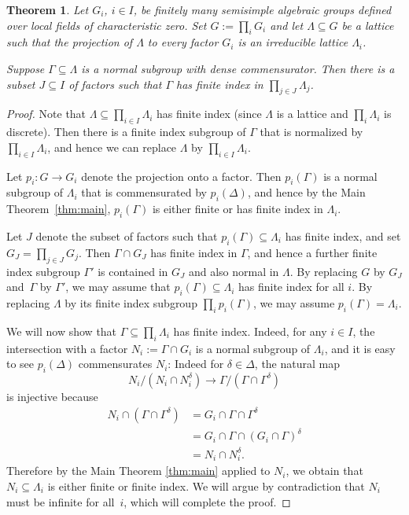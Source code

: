 \documentclass[11pt]{article}
\numberwithin{equation}{section}\providecommand{\llangle}{\langle\!\langle}\providecommand{\rrangle}{\rangle\!\rangle}\providecommand{\Asterisk}{\ast}
\newtheorem{thm}{Theorem}[section]
\theoremstyle{definition}
\begin{document}
\begin{thm}\label{thm:reducible}
Let $G_i$, $i\in I$, be finitely many semisimple algebraic groups defined over local fields of characteristic zero. Set $G:=\prod_i G_i$ and let $\Lambda\subseteq G$ be a lattice such that the projection of $\Lambda$ to every factor $G_i$ is an irreducible lattice $\Lambda_i$.

Suppose $\Gamma\subseteq \Lambda$ is a normal subgroup with dense commensurator. Then there is a subset $J\subseteq I$ of factors such that $\Gamma$ has finite index in $\prod_{j\in J} \Lambda_j$.
\end{thm}
\begin{proof} Note that $\Lambda\subseteq \prod_{i\in I} \Lambda_i$ has finite index (since $\Lambda$ is a lattice and $\prod_i \Lambda_i$ is discrete). Then there is a finite index subgroup of $\Gamma$ that is normalized by $\prod_{i\in I} \Lambda_i$, and hence we can replace $\Lambda$ by $\prod_{i\in I} \Lambda_i$.

Let $p_i:G\to G_i$ denote the projection onto a factor. Then $p_i(\Gamma)$ is a normal subgroup of $\Lambda_i$ that is commensurated by $p_i(\Delta)$, and hence by the Main Theorem~\ref{thm:main}, $p_i(\Gamma)$ is either finite or has finite index in $\Lambda_i$.

Let $J$ denote the subset of factors such that $p_i(\Gamma)\subseteq\Lambda_i$ has finite index, and set $G_J=\prod_{j\in J} G_j$. Then $\Gamma\cap G_J$ has finite index in $\Gamma$, and hence a further finite index subgroup $\Gamma'$ is contained in $G_J$ and also normal in $\Lambda$. By replacing $G$ by $G_J$ and~$\Gamma$ by $\Gamma'$, we may assume that $p_i(\Gamma)\subseteq \Lambda_i$ has finite index for all $i$. By replacing $\Lambda$ by its finite index subgroup $\prod_i p_i(\Gamma)$, we may assume $p_i(\Gamma)=\Lambda_i$.

We will now show that $\Gamma\subseteq \prod_i \Lambda_i$ has finite index. Indeed, for any $i\in I$, the intersection with a factor $N_i:=\Gamma\cap G_i$ is a normal subgroup of $\Lambda_i$, and it is easy to see $p_i(\Delta)$ commensurates $N_i$: Indeed for $\delta\in\Delta$, the natural map
\[
N_i/(N_i\cap N_i^\delta) \to \Gamma / (\Gamma\cap\Gamma^\delta)
\]
is injective because
\begin{align*}
N_i\cap (\Gamma \cap \Gamma^\delta) &= G_i \cap \Gamma\cap \Gamma^\delta \\
&= G_i\cap \Gamma \cap (G_i\cap \Gamma)^\delta \\
&= N_i\cap N_i^\delta.
\end{align*}
Therefore by the Main Theorem \ref{thm:main} applied to $N_i$, we obtain that $N_i\subseteq \Lambda_i$ is either finite or finite index. We will argue by contradiction that $N_i$ must be infinite for all~$i$, which will complete the proof.


\end{proof}
\end{document}

